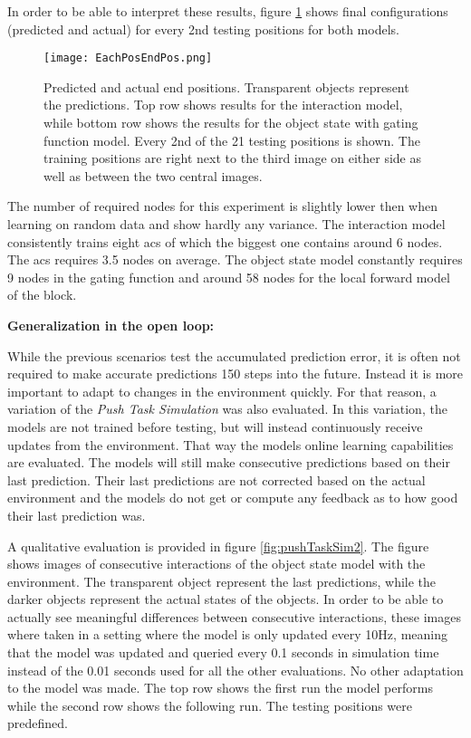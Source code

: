 In order to be able to interpret these results, figure \ref{fig:EachPosEndPos} shows final configurations (predicted and actual) for every 2nd testing positions for both models.

\begin{figure}
\centering
\texttt{[image: EachPosEndPos.png]}
\caption{Predicted and actual end positions. Transparent objects represent the predictions. Top row shows results for the interaction model, while bottom row shows the results for the object state with gating function model. Every 2nd of the 21 testing positions is shown. The training positions are right next to the third image on either side as well as between the two central images.}
\label{fig:EachPosEndPos}
\end{figure}

The number of required nodes for this experiment is slightly lower then when learning on random data and show hardly any variance. The interaction model consistently trains eight \glspl{ac} of which the biggest one contains around 6 nodes. The \gls{acs} requires 3.5 nodes on average. 
The object state model constantly requires 9 nodes in the gating function and around 58 nodes for the local forward model of the block.

\textbf{Generalization in the open loop:}

While the previous scenarios test the accumulated prediction error, it is often not required to make accurate predictions 150 steps into the future. Instead it is more important to adapt to changes in the environment quickly. For that reason, a variation of the \textit{Push Task Simulation} was also evaluated. In this variation, the models are not trained before testing, but will instead continuously receive updates from the environment. That way the models online learning capabilities are evaluated. The models will still make consecutive predictions based on their last prediction. Their last predictions are not corrected based on the actual environment and the models do not get or compute any feedback as to how good their last prediction was. 

A qualitative evaluation is provided in figure \ref{fig:pushTaskSim2}. The figure shows images of consecutive interactions of the object state model with the environment. The transparent object represent the last predictions, while the darker objects represent the actual states of the objects. In order to be able to actually see meaningful differences between consecutive interactions, these images where taken in a setting where the model is only updated every 10Hz, meaning that the model was updated and queried every 0.1 seconds in simulation time instead of the 0.01 seconds used for all the other evaluations. No other adaptation to the model was made. The top row shows the first run the model performs while the second row shows the following run. The testing positions were predefined.

